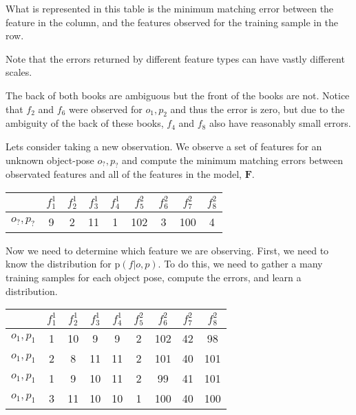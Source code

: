 \documentclass[11pt]{article}
\newcommand{\SetOf}[1]{\mathbf{#1}} %
\newcommand{\prob}[1]{\text{p}(#1)} %
\begin{document}
	What is represented in this table is the minimum matching error between the feature in the column, and the features observed for the training sample in the row.

	Note that the errors returned by different feature types can have vastly different scales. 

	The back of both books are ambiguous but the front of the books are not. Notice that $f_2$ and $f_6$ were observed for $o_1,p_2$ and thus the error is zero, but due to the ambiguity of the back of these books, $f_4$ and $f_8$ also have reasonably small errors.

	Lets consider taking a new observation. We observe a set of features for an unknown object-pose $o_?,p_?$ and compute the minimum matching errors between observated features and all of the features in the model, $\SetOf{F}$. 

	\begin{table}[h]
		\centering
		\begin{tabular}{c|c c c c c c c c} %
			& $f_1^1$ & $f_2^1$ & $f_3^1$ & $f_4^1$ & $f_5^2$ & $f_6^2$ & $f_7^2$ & $f_8^2$ \\
			\hline 	    %
			$o_?,p_?$ 	& 9 	& 2 	& 11	& 1		& 102 	& 3 	& 100	& 4	
		\end{tabular}
	\end{table}

	Now we need to determine which feature we are observing. First, we need to know the distribution for $\prob{f|o,p}$. To do this, we need to gather a many training samples for each object pose, compute the errors, and learn a distribution.

	\begin{table}[h]
		\centering
		\begin{tabular}{c|c c c c c c c c} %
			& $f_1^1$ & $f_2^1$ & $f_3^1$ & $f_4^1$ & $f_5^2$ & $f_6^2$ & $f_7^2$ & $f_8^2$ \\
			\hline 	    %
			$o_1,p_1$ 	& 1 	& 10 	& 9 	& 9	& 2 	& 102 	& 42 	& 98	\\
			$o_1,p_1$ 	& 2 	& 8 	& 11 	& 11	& 2 	& 101 	& 40 	& 101	\\
			$o_1,p_1$ 	& 1 	& 9 	& 10 	& 11	& 2 	& 99 	& 41 	& 101	\\
			$o_1,p_1$ 	& 3 	& 11 	& 10 	& 10	& 1 	& 100 	& 40 	& 100
		\end{tabular}
		\label{tab:trainingErrors}
	\end{table}
\end{document}
